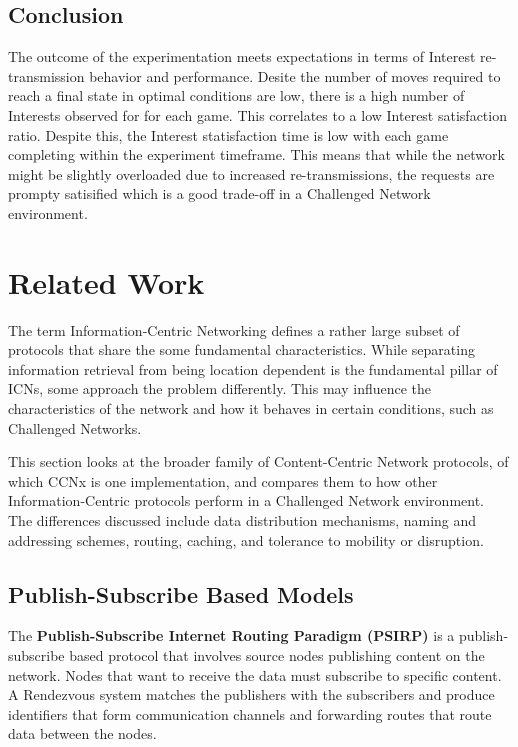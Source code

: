 \documentclass[a4paper,12pt]{report}      %
\begin{document}
\begin{descripton}
\section{Conclusion}

The outcome of the experimentation meets expectations in terms of Interest re-transmission behavior and performance.
Desite the number of moves required to reach a final state in optimal conditions are low, there is a high number of Interests observed for for each game.
This correlates to a low Interest satisfaction ratio. Despite this, the Interest statisfaction time is low with each game completing within the experiment timeframe.
This means that while the network might be slightly overloaded due to increased re-transmissions, the requests are prompty satisified which is a good trade-off in a Challenged Network environment.

\pagebreak
\chapter{Related Work}

The term Information-Centric Networking defines a rather large subset of protocols that share the some
fundamental characteristics. While separating information retrieval from being location dependent is
the fundamental pillar of ICNs, some approach the problem differently. This may influence the
characteristics of the network and how it behaves in certain conditions, such as Challenged Networks.

This section looks at the broader family of Content-Centric Network protocols, of which CCNx is one
implementation, and compares them to how other Information-Centric protocols perform in a
Challenged Network environment. The differences discussed include data distribution mechanisms,
naming and addressing schemes, routing, caching, and tolerance to mobility or disruption.\cite{dirk2941}

\section{Publish-Subscribe Based Models}

The \textbf{Publish-Subscribe Internet Routing Paradigm (PSIRP)} is a publish-subscribe based protocol
that involves source nodes publishing content on the network. Nodes that want to receive the data must
subscribe to specific content. A Rendezvous system matches the publishers with the subscribers and
produce identifiers that form communication channels and forwarding routes that route data between
the nodes.


\end{descripton}
\end{document}
